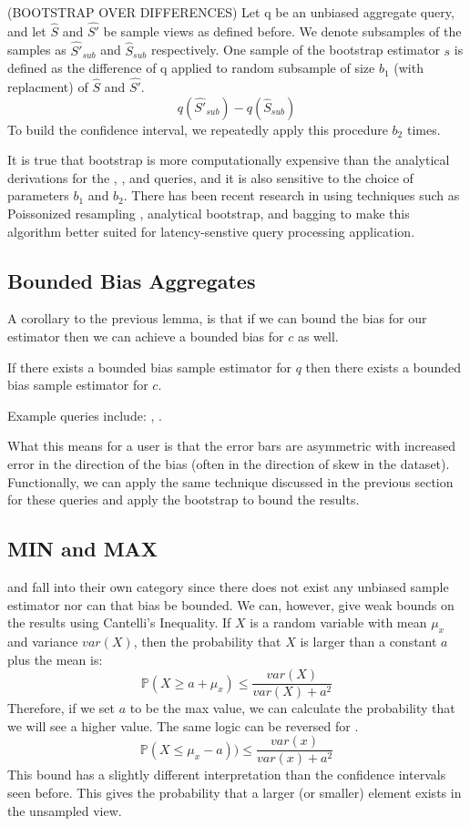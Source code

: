 \begin{proposition} (BOOTSTRAP OVER DIFFERENCES) Let q be an unbiased aggregate query, and let $\hat{S}$ and $\hat{S'}$ be sample views as defined before.
We denote subsamples of the samples as $\hat{S'}_{sub}$ and $\hat{S}_{sub}$ respectively.
One sample of the bootstrap estimator $s$ is defined as the difference of q applied to random subsample of size $b_1$ (with replacment) of $\hat{S}$ and $\hat{S'}$.
\[q(\hat{S'}_{sub}) - q(\hat{S}_{sub})\]
To build the confidence interval, we repeatedly apply this procedure $b_2$ times.
\end{proposition}

It is true that bootstrap is more computationally expensive than the analytical derivations for the \sumfunc, \countfunc, and \avgfunc queries, and it is also sensitive to the choice of parameters $b_1$ and $b_2$.
There has been recent research in using techniques such as Poissonized resampling \cite{agarwalknowing}, analytical bootstrap\cite{DBLP:conf/sigmod/ZengGMZ14}, and bagging \cite{DBLP:conf/kdd/KleinerTASJ13} to make this algorithm better suited for latency-senstive query processing application.

\subsection{Bounded Bias Aggregates}
A corollary to the previous lemma, is that if we can bound the bias for our estimator then we can achieve a bounded bias for $c$ as well.
\begin{corollary}
If there exists a bounded bias sample estimator for $q$ then there exists a bounded bias sample estimator for $c$.
\end{corollary}
Example queries include: \medfunc, \percfunc.

What this means for a user is that the error bars are asymmetric with increased error in the direction of the bias (often in the direction of skew in the dataset).
Functionally, we can apply the same technique discussed in the previous section for these queries and apply the bootstrap to bound the results. 

\subsection{MIN and MAX}
\minfunc and \maxfunc fall into their own category since there does not exist any unbiased sample estimator nor can that bias be bounded.
We can, however, give weak bounds on the results using Cantelli's Inequality.
If $X$ is a random variable with mean $\mu_x$ and variance $var(X)$, then the probability that $X$ is larger than a constant $a$ plus the mean is:
\[
\mathbb{P}(X \ge a + \mu_x ) \le \frac{var(X)}{var(X) + a^2}
\]
Therefore, if we set $a$ to be the max value, we can calculate the probability that we will see a higher value. The same logic can be reversed for \minfunc.
\[
\mathbb{P}(X \le \mu_x - a )) \le \frac{var(x)}{var(x) + a^2}
\]
This bound has a slightly different interpretation than the confidence intervals seen before.
This gives the probability that a larger (or smaller) element exists in the unsampled view.

